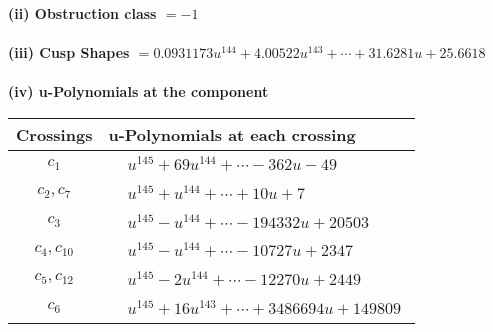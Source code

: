 \documentclass[1p]{elsarticle_modified}
\theoremstyle{definition}
\begin{document}
\flushleft \textbf{(ii) Obstruction class $= -1$}\\~\\
\flushleft \textbf{(iii) Cusp Shapes $= 0.0931173 u^{144}+4.00522 u^{143}+\cdots+31.6281 u+25.6618$}\\~\\
\newpage\renewcommand{\arraystretch}{1}
\flushleft \textbf{(iv) u-Polynomials at the component}\newline \\
\begin{tabular}{m{50pt}|m{274pt}}
Crossings & \hspace{64pt}u-Polynomials at each crossing \\
\hline $$\begin{aligned}c_{1}\end{aligned}$$&$\begin{aligned}
&u^{145}+69 u^{144}+\cdots-362 u-49
\end{aligned}$\\
\hline $$\begin{aligned}c_{2},c_{7}\end{aligned}$$&$\begin{aligned}
&u^{145}+u^{144}+\cdots+10 u+7
\end{aligned}$\\
\hline $$\begin{aligned}c_{3}\end{aligned}$$&$\begin{aligned}
&u^{145}- u^{144}+\cdots-194332 u+20503
\end{aligned}$\\
\hline $$\begin{aligned}c_{4},c_{10}\end{aligned}$$&$\begin{aligned}
&u^{145}- u^{144}+\cdots-10727 u+2347
\end{aligned}$\\
\hline $$\begin{aligned}c_{5},c_{12}\end{aligned}$$&$\begin{aligned}
&u^{145}-2 u^{144}+\cdots-12270 u+2449
\end{aligned}$\\
\hline $$\begin{aligned}c_{6}\end{aligned}$$&$\begin{aligned}
&u^{145}+16 u^{143}+\cdots+3486694 u+149809
\end{aligned}$\\

\end{tabular}
\end{document}

